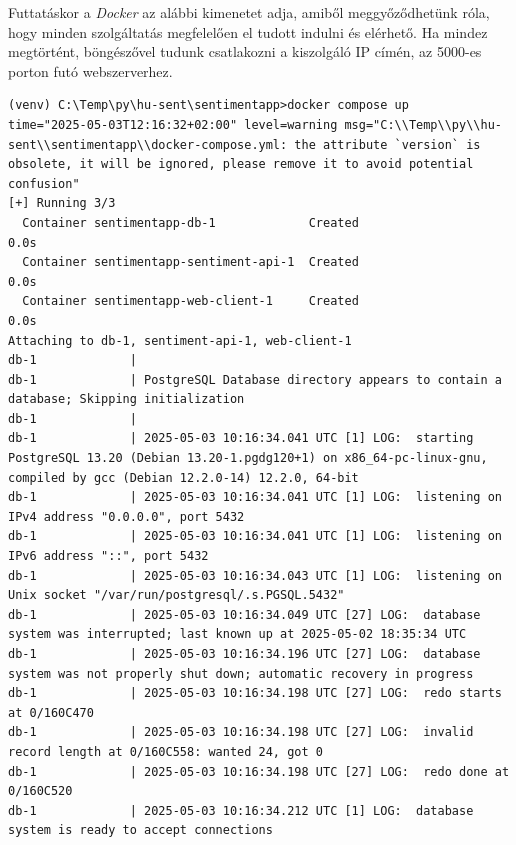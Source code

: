 \documentclass[12pt]{article}
\begin{document}
Futtatáskor a \textit{Docker} az alábbi kimenetet adja, amiből meggyőződhetünk róla, hogy minden szolgáltatás megfelelően el tudott indulni és elérhető. Ha mindez megtörtént, böngészővel tudunk csatlakozni a kiszolgáló IP címén, az 5000-es porton futó webszerverhez.

\begin{lstlisting}[style=docker]
(venv) C:\Temp\py\hu-sent\sentimentapp>docker compose up
time="2025-05-03T12:16:32+02:00" level=warning msg="C:\\Temp\\py\\hu-sent\\sentimentapp\\docker-compose.yml: the attribute `version` is obsolete, it will be ignored, please remove it to avoid potential confusion"
[+] Running 3/3
  Container sentimentapp-db-1             Created                                                                                          0.0s
  Container sentimentapp-sentiment-api-1  Created                                                                                          0.0s
  Container sentimentapp-web-client-1     Created                                                                                          0.0s
Attaching to db-1, sentiment-api-1, web-client-1
db-1             |
db-1             | PostgreSQL Database directory appears to contain a database; Skipping initialization
db-1             |
db-1             | 2025-05-03 10:16:34.041 UTC [1] LOG:  starting PostgreSQL 13.20 (Debian 13.20-1.pgdg120+1) on x86_64-pc-linux-gnu, compiled by gcc (Debian 12.2.0-14) 12.2.0, 64-bit
db-1             | 2025-05-03 10:16:34.041 UTC [1] LOG:  listening on IPv4 address "0.0.0.0", port 5432
db-1             | 2025-05-03 10:16:34.041 UTC [1] LOG:  listening on IPv6 address "::", port 5432
db-1             | 2025-05-03 10:16:34.043 UTC [1] LOG:  listening on Unix socket "/var/run/postgresql/.s.PGSQL.5432"
db-1             | 2025-05-03 10:16:34.049 UTC [27] LOG:  database system was interrupted; last known up at 2025-05-02 18:35:34 UTC
db-1             | 2025-05-03 10:16:34.196 UTC [27] LOG:  database system was not properly shut down; automatic recovery in progress
db-1             | 2025-05-03 10:16:34.198 UTC [27] LOG:  redo starts at 0/160C470
db-1             | 2025-05-03 10:16:34.198 UTC [27] LOG:  invalid record length at 0/160C558: wanted 24, got 0
db-1             | 2025-05-03 10:16:34.198 UTC [27] LOG:  redo done at 0/160C520
db-1             | 2025-05-03 10:16:34.212 UTC [1] LOG:  database system is ready to accept connections

\end{lstlisting}
\end{document}
